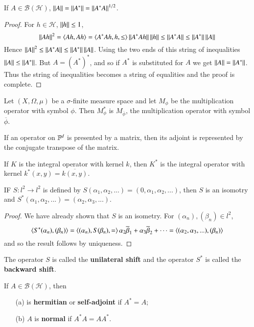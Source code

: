 \begin{prop}
    If $A \in \mathscr{B}(\mathscr{H})$, $\left|\left| A\right|\right| = \left|\left| A^*\right|\right| = \left|\left| A^*A\right|\right|^{1/2}$.
\end{prop}
\begin{proof}
    For $h \in \mathscr{H}$, $\left|\left| h\right|\right| \leq 1$, $$\left|\left| Ah\right|\right|^2 = \left\langle Ah, Ah\right\rangle = \left\langle A^*Ah,h, \leq\right\rangle \left|\left| A^*Ah\right|\right|\left|\left| h\right|\right| \leq \left|\left| A^*A\right|\right| \leq \left|\left| A^*\right|\right|\left|\left| A\right|\right|$$
    Hence $\left|\left| A\right|\right|^2 \leq \left|\left| A^*A\right|\right|\leq \left|\left| A^*\right|\right|\left|\left| A\right|\right|$. Using the two ends of this string of inequalities $\left|\left| A\right|\right| \leq \left|\left| A^*\right|\right|$. But $A = (A^*)^*$, and so if $A^*$ is substituted for $A$ we get $\left|\left| A\right|\right| = \left|\left| A^*\right|\right|$. Thus the string of inequalities becomes a string of equalities and the proof is complete.
\end{proof}

\begin{eg}
    Let $(X,\Omega,\mu)$ be a $\sigma$-finite measure space and let $M_{\phi}$ be the multiplication operator with symbol $\phi$. Then $M_{\phi}^*$ is $M_{\overline{\phi}}$, the multiplication operator with symbol $\overline{\phi}$.
\end{eg}

If an operator on $\mathbb F^d$ is presented by a matrix, then its adjoint is represented by the conjugate transpose of the matrix.

\begin{eg}
    If $K$ is the integral operator with kernel $k$, then $K^*$ is the integral operator with kernel $k^*(x,y) = \overline{k(x,y)}$.
\end{eg}

\begin{prop}
    IF $S:l^2\rightarrow l^2$ is defined by $S(\alpha_1,\alpha_2,...) = (0,\alpha_1,\alpha_2,...)$, then $S$ is an isomotry and $S^*(\alpha_1,\alpha_2,...) = (\alpha_2,\alpha_3,...)$.
\end{prop}
\begin{proof}
    We have already shown that $S$ is an isometry. For $(\alpha_n),(\beta_n) \in l^2$, $$\left\langle S^*(\alpha_n), (\beta_n)\right\rangle = \left\langle (\alpha_n),S(\beta_n), =\right\rangle \alpha_2\overline{\beta}_1+\alpha_3\overline{\beta}_2 +\cdots = \left\langle (\alpha_2,\alpha_3,...), (\beta_n)\right\rangle$$
    and so the result follows by uniqueness.
\end{proof}

The operator $S$ is called the \textbf{unilateral shift} and the operator $S^*$ is called the \textbf{backward shift}.

\begin{defn}
    If $A \in \mathscr{B}(\mathscr{H})$, then \begin{enumerate}
        \item[(a)] is \textbf{hermitian} or \textbf{self-adjoint} if $A^* = A$;
        \item[(b)] $A$ is \textbf{normal} if $A^*A = AA^*$.
    \end{enumerate}
\end{defn}

